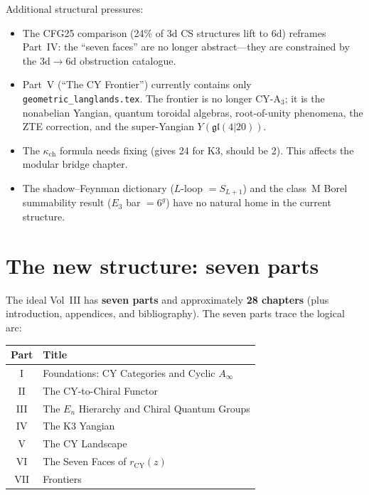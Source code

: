\documentclass[11pt]{article}
\newcommand{\CY}{\mathrm{CY}}
\newcommand{\En}{E_n}
\newcommand{\Ainf}{A_\infty}
\begin{document}
Additional structural pressures:

\begin{itemize}
\item The CFG25 comparison (24\% of 3d CS structures lift to 6d)
 reframes Part~IV: the ``seven faces'' are no longer abstract---they
 are constrained by the 3d$\to$6d obstruction catalogue.
\item Part~V (``The CY Frontier'') currently contains only
 \texttt{geometric\_langlands.tex}. The frontier is no longer CY-A$_3$;
 it is the nonabelian Yangian, quantum toroidal algebras,
 root-of-unity phenomena, the ZTE correction, and the super-Yangian
 $Y(\mathfrak{gl}(4|20))$.
\item The $\kappa_{\mathrm{ch}}$ formula needs fixing (gives 24 for K3,
 should be 2). This affects the modular bridge chapter.
\item The shadow--Feynman dictionary ($L$-loop $= S_{L+1}$) and the
 class~M Borel summability result ($E_3$ bar $= 6^g$) have no natural
 home in the current structure.
\end{itemize}

\section{The new structure: seven parts}

The ideal Vol~III has \textbf{seven parts} and approximately
\textbf{28 chapters} (plus introduction, appendices, and bibliography).
The seven parts trace the logical arc:

\begin{center}
\renewcommand{\arraystretch}{1.15}
\begin{tabular}{cl}
\toprule
Part & Title \\
\midrule
I & Foundations: CY Categories and Cyclic $\Ainf$ \\
II & The CY-to-Chiral Functor \\
III & The $\En$ Hierarchy and Chiral Quantum Groups \\
IV & The K3 Yangian \\
V & The CY Landscape \\
VI & The Seven Faces of $r_{\CY}(z)$ \\
VII & Frontiers \\
\bottomrule
\end{tabular}
\end{center}
\end{document}
